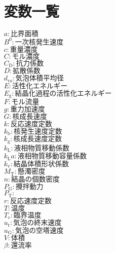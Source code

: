 \documentclass[a4j]{jsreport}
\begin{document}
\newpage


\newpage
\chapter*{変数一覧}
\begin{multicols}{2}
\begin{flushleft}
  $a : \text{比界面積}$ \\
  $B^0 : \text{一次核発生速度}$ \\
  $c : \text{重量濃度}$ \\
  $C : \text{モル濃度}$ \\
  $C_\mathrm{D} : \text{抗力係数}$ \\
  $D : \text{拡散係数}$ \\
  $d_\mathrm{vs} : \text{気泡体積平均径}$ \\
  $E : \text{活性化エネルギー}$ \\
  $E_\mathrm{g} : \text{結晶化過程の活性化エネルギー}$ \\
  $F : \text{モル流量}$ \\
  $g : \text{重力加速度}$ \\
  $G : \text{核成長速度}$ \\
  $k : \text{反応速度定数}$ \\
  $k_\mathrm{b} : \text{核発生速度定数}$ \\
  $k_\mathrm{g} : \text{核成長速度定数}$ \\
  $k_\mathrm{L} : \text{液相物質移動係数}$ \\
  $k_\mathrm{L} a : \text{液相物質移動容量係数}$ \\
  $k_\mathrm{v} : \text{結晶体積形状係数}$ \\
  $M_\mathrm{T} : \text{懸濁密度}$ \\
  $n : \text{結晶の個数密度}$ \\
  $P_\mathrm{G} : \text{攪拌動力}$ \\
  $P_\mathrm{T} : \text{}$ \\
  $r : \text{反応速度定数}$ \\
  $T : \text{温度}$ \\
  $T_\mathrm{c} : \text{臨界温度}$ \\
  $u_\mathrm{t} : \text{気泡の終末速度}$ \\
  $u_\mathrm{G} : \text{気泡の空塔速度}$ \\
  $V : \text{体積}$ \\
  $\beta : \text{還流率}$ \\

\end{flushleft}
\end{multicols}
\end{document}
